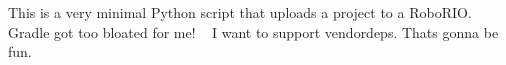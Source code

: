 This is a very minimal Python script that uploads a project to a Robo\+RIO. Gradle got too bloated for me! ~\newline
 I want to support vendordeps. That\textquotesingle{}s gonna be fun. 